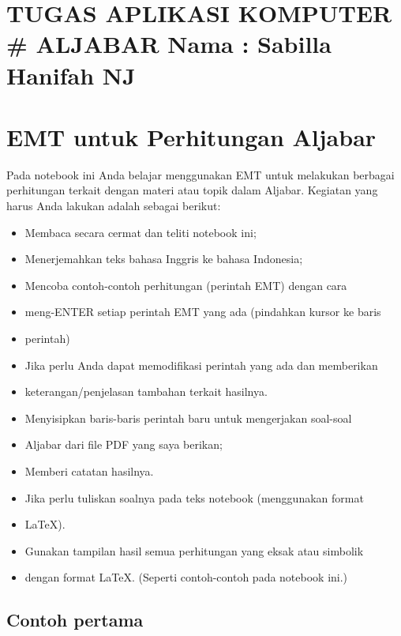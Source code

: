 \documentclass[
]{book}
\author{}
\date{}
\begin{document}
\frontmatter

\mainmatter
\chapter{TUGAS APLIKASI KOMPUTER \# ALJABAR Nama : Sabilla Hanifah NJ}\label{tugas-aplikasi-komputer-aljabar-nama-sabilla-hanifah-nj}

\chapter{EMT untuk Perhitungan Aljabar}\label{emt-untuk-perhitungan-aljabar}

Pada notebook ini Anda belajar menggunakan EMT untuk melakukan berbagai perhitungan terkait dengan materi atau topik dalam Aljabar. Kegiatan yang harus Anda lakukan adalah sebagai berikut:

\begin{itemize}
\item
  Membaca secara cermat dan teliti notebook ini;
\item
  Menerjemahkan teks bahasa Inggris ke bahasa Indonesia;
\item
  Mencoba contoh-contoh perhitungan (perintah EMT) dengan cara
\item
  meng-ENTER setiap perintah EMT yang ada (pindahkan kursor ke baris
\item
  perintah)
\item
  Jika perlu Anda dapat memodifikasi perintah yang ada dan memberikan
\item
  keterangan/penjelasan tambahan terkait hasilnya.
\item
  Menyisipkan baris-baris perintah baru untuk mengerjakan soal-soal
\item
  Aljabar dari file PDF yang saya berikan;
\item
  Memberi catatan hasilnya.
\item
  Jika perlu tuliskan soalnya pada teks notebook (menggunakan format
\item
  LaTeX).
\item
  Gunakan tampilan hasil semua perhitungan yang eksak atau simbolik
\item
  dengan format LaTeX. (Seperti contoh-contoh pada notebook ini.)
\end{itemize}

\section{Contoh pertama}\label{contoh-pertama}
\end{document}
